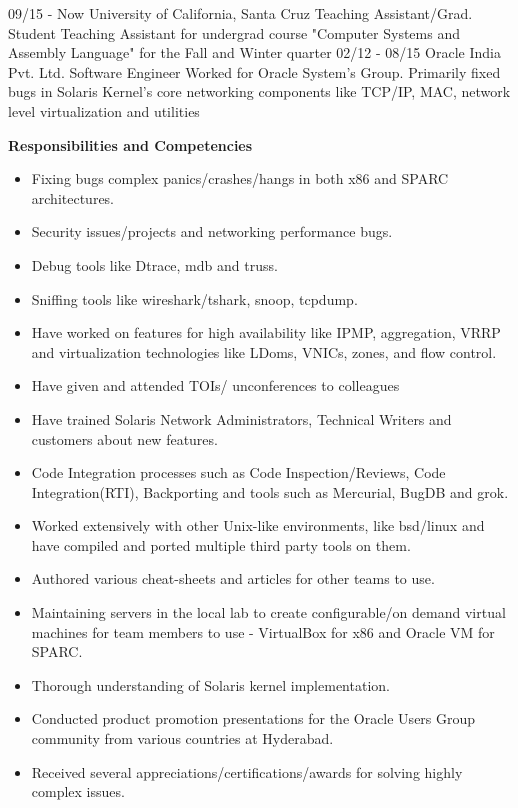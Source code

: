 \documentclass[]{priyesh-cv}
\begin{document}
\begin{entrylist}
  \entry
    {09/15 - Now}
    {University of California, Santa Cruz}
    {Teaching Assistant/Grad. Student}
    {Teaching Assistant for undergrad course "Computer Systems and Assembly Language" for the Fall and Winter quarter}
    {}
  \entry
    {02/12 - 08/15}
    {Oracle India Pvt. Ltd.}
    {Software Engineer}
    {Worked for Oracle System's Group. Primarily fixed bugs in Solaris Kernel’s core networking components like TCP/IP, MAC, network level virtualization and utilities \\}
    {\textbf{Responsibilities and Competencies}
    \begin{itemize}
        \item Fixing bugs complex panics/crashes/hangs in both x86 and SPARC architectures.
        \item Security issues/projects and networking performance bugs.
        \item Debug tools like Dtrace, mdb and truss. 
        \item Sniffing tools like wireshark/tshark, snoop, tcpdump.
        \item Have worked on features for high availability like IPMP, aggregation, VRRP and virtualization technologies like LDoms, VNICs, zones, and flow control.
        \item Have given and attended TOIs/ unconferences to colleagues
        \item Have trained Solaris Network Administrators, Technical Writers and customers about new features.
        \item Code Integration processes such as Code Inspection/Reviews, Code Integration(RTI), Backporting and tools such as Mercurial, BugDB and grok.
        \item Worked extensively with other Unix-like environments, like bsd/linux and have compiled and ported multiple third party tools on them.
        \item Authored various cheat-sheets and articles for other teams to use.
        \item Maintaining servers in the local lab to create configurable/on demand virtual machines for team members to use - VirtualBox for x86 and Oracle VM for SPARC.
        \item Thorough understanding of Solaris kernel implementation.
        \item Conducted product promotion presentations for the Oracle Users Group community from various countries at Hyderabad.
        \item Received several appreciations/certifications/awards for solving highly complex issues.
    \end{itemize}
    }
\end{entrylist}
\end{document}
